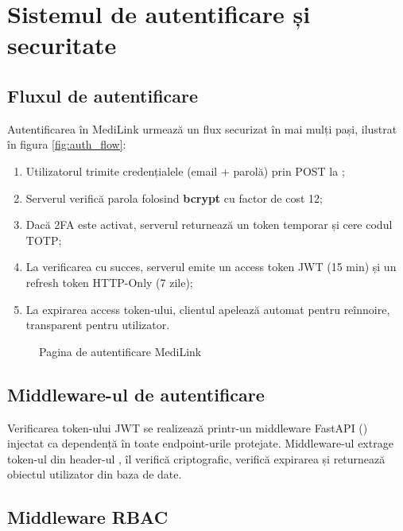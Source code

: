 \section{Sistemul de autentificare și securitate}

\subsection{Fluxul de autentificare}

Autentificarea în MediLink urmează un flux securizat în mai mulți pași, ilustrat în figura \ref{fig:auth_flow}:

\begin{enumerate}
  \item Utilizatorul trimite credențialele (email + parolă) prin POST la ;
  \item Serverul verifică parola folosind \textbf{bcrypt} cu factor de cost 12;
  \item Dacă 2FA este activat, serverul returnează un token temporar și cere codul TOTP;
  \item La verificarea cu succes, serverul emite un access token JWT (15 min) și un refresh token HTTP-Only (7 zile);
  \item La expirarea access token-ului, clientul apelează automat  pentru reînnoire, transparent pentru utilizator.
\end{enumerate}

\begin{figure}[H]
  \centering
  \caption{Pagina de autentificare MediLink}
  \label{fig:login}
\end{figure}

\subsection{Middleware-ul de autentificare}

Verificarea token-ului JWT se realizează printr-un middleware FastAPI () injectat ca dependență în toate endpoint-urile protejate. Middleware-ul extrage token-ul din header-ul , îl verifică criptografic, verifică expirarea și returnează obiectul utilizator din baza de date.

\subsection{Middleware RBAC}

